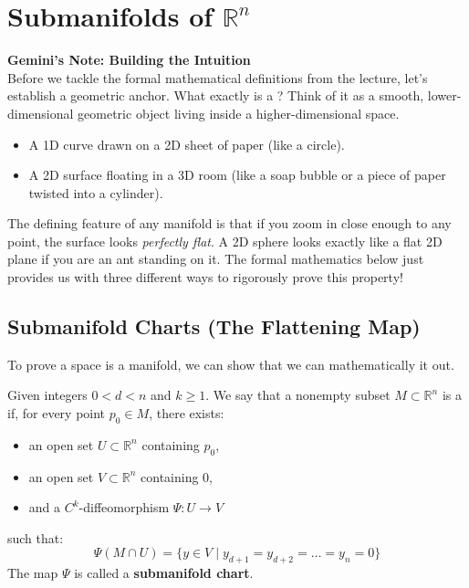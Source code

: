 \section{Submanifolds of $\mathbb{R}^n$}

\begin{extra}
\textbf{Gemini's Note: Building the Intuition}\\
Before we tackle the formal mathematical definitions from the lecture, let's establish a geometric anchor. What exactly is a ? Think of it as a smooth, lower-dimensional geometric object living inside a higher-dimensional space. 
\begin{itemize}
    \item A 1D curve drawn on a 2D sheet of paper (like a circle).
    \item A 2D surface floating in a 3D room (like a soap bubble or a piece of paper twisted into a cylinder).
\end{itemize}
The defining feature of any manifold is that if you zoom in close enough to any point, the surface looks \emph{perfectly flat}. A 2D sphere looks exactly like a flat 2D plane if you are an ant standing on it. The formal mathematics below just provides us with three different ways to rigorously prove this  property!
\end{extra}

\subsection{Submanifold Charts (The Flattening Map)}

To prove a space is a manifold, we can show that we can mathematically  it out.

\setcounter{savedSec}{\value{section}}
\setcounter{savedThm}{\value{theorem}}

\setcounter{section}{12}
\setcounter{theorem}{9} %

\begin{definition}
Given integers $0 < d < n$ and $k \ge 1$. We say that a nonempty subset $M \subset \mathbb{R}^n$ is a  if, for every point $p_0 \in M$, there exists:
\begin{itemize}
    \item an open set $U \subset \mathbb{R}^n$ containing $p_0$,
    \item an open set $V \subset \mathbb{R}^n$ containing $0$,
    \item and a $C^k$-diffeomorphism $\Psi : U \to V$
\end{itemize}
such that:
\[
\Psi(M \cap U) = \{y \in V \mid y_{d+1} = y_{d+2} = \dots = y_n = 0\}
\]
The map $\Psi$ is called a \textbf{submanifold chart}.
\end{definition}

